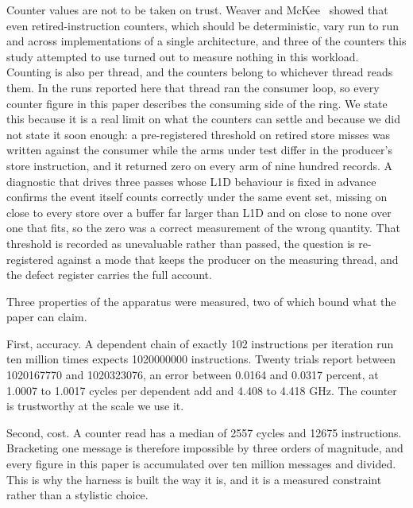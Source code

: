 \documentclass[conference]{IEEEtran}
\begin{document}
Counter values are not to be taken on trust. Weaver and
McKee~\cite{weaver2008trusted} showed that even retired-instruction counters,
which should be deterministic, vary run to run and across implementations of a
single architecture, and three of the counters this study attempted to use turned
out to measure nothing in this workload. Counting is also per thread, and the
counters belong to whichever thread reads them.
In the runs reported here that thread ran the consumer loop, so every counter
figure in this paper describes the consuming side of the ring. We state this
because it is a real limit on what the counters can settle and because we did
not state it soon enough: a pre-registered threshold on retired store misses
was written against the consumer while the arms under test differ in the
producer's store instruction, and it returned zero on every arm of nine hundred
records. A diagnostic that drives three passes whose L1D behaviour is fixed in
advance confirms the event itself counts correctly under the same event set,
missing on close to every store over a buffer far larger than L1D and on
close to none over one that fits, so the zero was a correct measurement of the
wrong quantity. That threshold is recorded as unevaluable rather than passed, the
question is re-registered against a mode that keeps the producer on the
measuring thread, and the defect register carries the full account.

Three properties of the apparatus were measured, two of which bound what the
paper can claim.

First, accuracy. A dependent chain of exactly 102 instructions per iteration run
ten million times expects 1020000000 instructions. Twenty trials report between
1020167770 and 1020323076, an error between 0.0164 and 0.0317 percent, at 1.0007
to 1.0017 cycles per dependent add and 4.408 to 4.418 GHz. The counter is
trustworthy at the scale we use it.

Second, cost. A counter read has a median of 2557 cycles and 12675
instructions. Bracketing one message is therefore impossible by three orders of
magnitude, and every figure in this paper is accumulated over ten million
messages and divided. This is why the harness is built the way it is, and it is
a measured constraint rather than a stylistic choice.
\end{document}

